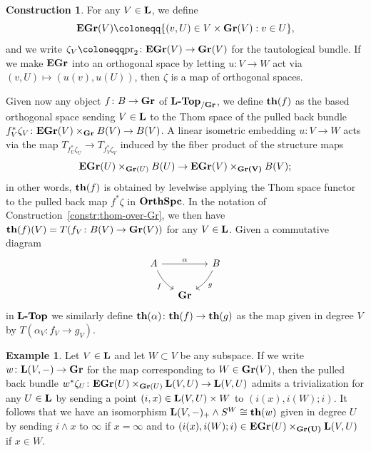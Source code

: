 \documentclass[reqno]{memo-l}
\theoremstyle{mythm}
\theoremstyle{definition}
\newtheorem{constr}[thm]{Construction}
\newtheorem{ex}[thm]{Example}
\numberwithin{equation}{section}
\newcommand{\cat}[1]{\textbf{\textup{#1}}}
\newcommand{\pr}{\textup{pr}}
\let\smashp=\wedge
\begin{document}
\begin{constr}\label{constr:Thom-space-functor-gl}
    For any $V\in\cat{L}$, we define 
    \[
        \cat{EGr}(V)\coloneqq\{(v,U)\in V\times\cat{Gr}(V) : v \in U\},
    \]
    and we write $\zeta_V\coloneqq\pr_2\colon\cat{EGr}(V)\to\cat{Gr}(V)$ for the tautological bundle. If we make $\cat{EGr}$ into an orthogonal space by letting $u\colon V\to W$ act via $(v,U)\mapsto (u(v),u(U))$, then $\zeta$ is a map of orthogonal spaces. 

    Given now any object $f\colon B\to\cat{Gr}$ of $\cat{$\cat{L}$-Top}_{/\cat{Gr}}$, we define $\cat{th}(f)$ as the based orthogonal space sending $V\in\cat{L}$ to the Thom space of the pulled back bundle $f_V^*\zeta_V\colon\cat{EGr}(V)\times_{\cat{Gr}} B(V)\to B(V)$. A linear isometric embedding $u\colon V\to W$ acts via the map $T_{f_U^*\zeta_U}\to T_{f^*_V\zeta_V}$ induced by the fiber product of the structure maps
    \[
        \cat{EGr}(U)\times_{\cat{Gr}(U)}{B}(U)\to\cat{EGr}(V)\times_{\cat{Gr(V)}} B(V);
    \]
    in other words, $\cat{th}(f)$ is obtained by levelwise applying the Thom space functor to the pulled back map $f^*\zeta$ in $\cat{OrthSpc}$. In the notation of Construction~\ref{constr:thom-over-Gr}, we then have $\cat{th}(f)(V)=T(f_V\colon B(V)\to\cat{Gr}(V))$ for any $V\in\cat{L}$.
    Given a commutative diagram
    \[
        \begin{tikzcd}[column sep=small]
            A\arrow[rr,"\alpha"]\arrow[dr, bend right=15pt,"f"'] && B\arrow[dl,"g", bend left=15pt]\\
            &\cat{Gr}
        \end{tikzcd}
    \]
    in $\cat{$\cat{L}$-Top}$ we similarly define $\cat{th}(\alpha)\colon\cat{th}(f)\to\cat{th}(g)$ as the map given in degree $V$ by $T(\alpha_V\colon f_V\to g_V)$.
\end{constr}

\begin{ex}\label{ex:th-on-corep}
    Let $V\in\cat{L}$ and let $W\subset V$ be any subspace. If we write $w\colon\cat{L}(V,-)\to\cat{Gr}$ for the map corresponding to $W\in\cat{Gr}(V)$, then the pulled back bundle $w^*\zeta_U\colon\cat{EGr}(U)\times_{\cat{Gr}(U)}\cat{L}(V,U)\to\cat{L}(V,U)$ admits a trivialization for any $U\in\cat{L}$ by sending a point $(i,x)\in\cat{L}(V,U)\times W$ to $(i(x),i(W);i)$. It follows that  we have an isomorphism $\cat{L}(V,-)_+\smashp S^W\cong\cat{th}(w)$ given in degree $U$ by sending $i\smashp x$ to $\infty$ if $x=\infty$ and to $(i(x),i(W);i)\in\cat{EGr}(U)\times_\cat{Gr(U)}\cat{L}(V,U)$ if $x\in W$.
\end{ex}
\end{document}
